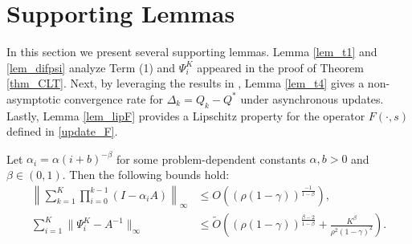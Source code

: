 \documentclass{opt2025} %
\begin{document}
\section{Supporting Lemmas}

In this section we present several supporting lemmas. Lemma \ref{lem_t1} and \ref{lem_difpsi} analyze Term (1) and $\Psi_i^K$ appeared in the proof of Theorem \ref{thm_CLT}. Next, by leveraging the results in \citet{chen2021lyapunov}, Lemma \ref{lem_t4} gives a non-asymptotic convergence rate for $\Delta_k = Q_k - Q^*$ under asynchronous updates. Lastly, Lemma \ref{lem_lipF} provides a Lipschitz property for the operator $F(\cdot,s)$ defined in \cref{update_F}.

\begin{lemma}
\label{lem_t1}
Let $\alpha_i = \alpha{(i + b)^{-\beta}}$ for some problem-dependent constants $\alpha, b > 0$ and $\beta \in (0,1)$. Then the following bounds hold:
\begin{align*}
\left\| \sum_{k=1}^K \prod_{i=0}^{k-1}(I - \alpha_i A) \right\|_{\infty} &\leq O\left( {( \rho(1-\gamma))^{\frac{-1}{1-\beta}}} \right), \\
\sum_{i=1}^K\|\Psi_i^K - A^{-1}\|_{\infty} &\leq \tilde{O}\left( {(\rho(1-\gamma))^{\frac{\beta-2}{1-\beta}}}  + \frac{K^{\beta}}{\rho^2(1-\gamma)^2} \right).
\end{align*}
\end{lemma}
\end{document}
